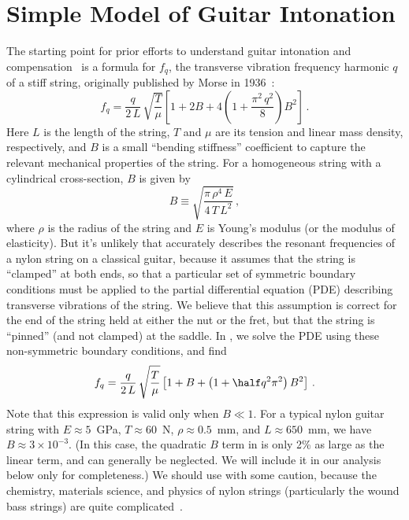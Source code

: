 %
%
%

 \section{Simple Model of Guitar Intonation\label{sct:model}}
The starting point for prior efforts to understand guitar intonation and compensation~\cite{ref:byers1996cgi,ref:varieschi2010icf} is a formula for $f_{q}$, the transverse vibration frequency harmonic $q$ of a stiff string, originally published by Morse in 1936~\cite{ref:morse1981vsb,ref:fletcher1964nvf, ref:fletcher2005pmb}:
 \begin{equation}\label{eqn:f_m_clamped}
f_{q} = \frac{q}{2\, L}\, \sqrt{\frac{T}{\mu}} \left[ 1 + 2 B + 4 \left(1 + \frac{\pi^2\, q^2}{8}\right) B^2 \right]\, .
 \end{equation}
Here $L$ is the length of the string, $T$ and $\mu$ are its tension and linear mass density, respectively, and $B$ is a small ``bending stiffness'' coefficient to capture the relevant mechanical properties of the string. For a homogeneous string with a cylindrical cross-section, $B$ is given by
 \begin{equation} \label{eqn:b_def}
B \equiv \sqrt{\frac{\pi\, \rho^4\, E}{4\, T\, L^2}}\, ,
 \end{equation}
where $\rho$ is the radius of the string and $E$ is Young's modulus (or the modulus of elasticity). But it's unlikely that  accurately describes the resonant frequencies of a nylon string on a classical guitar, because it assumes that the string is ``clamped'' at both ends, so that a particular set of symmetric boundary conditions must be applied to the partial differential equation (PDE) describing transverse vibrations of the string. We believe that this assumption is correct for the end of the string held at either the nut or the fret, but that the string is ``pinned'' (and not clamped) at the saddle. In , we solve the PDE using these non-symmetric boundary conditions, and find
 \begin{equation} \label{eqn:f_m_stiff}
f_q = \frac{q}{2\, L}\, \sqrt{\frac{T}{\mu}} \left[ 1 + B + \left( 1 + \half q^2 \pi^2 \right) B^2 \right]\, .
 \end{equation}
Note that this expression is valid only when $B \ll 1$. For a typical nylon guitar string with $E \approx 5$~GPa, $T \approx 60$~N, $\rho \approx 0.5$~mm, and $L \approx 650$~mm, we have $B \approx 3 \times 10^{-3}$. (In this case, the quadratic $B$ term in  is only 2\% as large as the linear term, and can generally be neglected. We will include it in our analysis below only for completeness.) We should use  with some caution, because the chemistry, materials science, and physics of nylon strings (particularly the wound bass strings) are quite complicated~\cite{ref:lynchaird2017mpn}.

